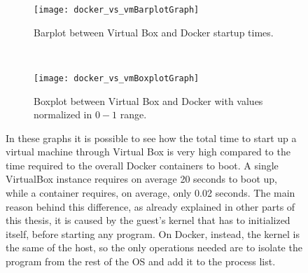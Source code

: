 \begin{figure}[t] %
    \centering
    \begin{subfigure}[b]{0.3\textwidth}
        \texttt{[image: docker\_vs\_vmBarplotGraph]}
        \caption{Barplot between Virtual Box and Docker startup times.}
        \label{chap:tests:sec:dockervsvb:img:barplot}
    \end{subfigure}
    ~ %
    \begin{subfigure}[b]{0.3\textwidth}
        \texttt{[image: docker\_vs\_vmBoxplotGraph]}
        \caption{Boxplot between Virtual Box and Docker with values normalized 
in $0-1$ range.}
        \label{chap:tests:sec:dockervsvb:img:boxplot}
    \end{subfigure}
    \caption[Virtual Box vs Docker start up comparison]{In these graphs it is 
possible to see how the total time to start up a virtual machine through Virtual 
Box is very high compared to the time required to the overall Docker containers 
to boot. A single VirtualBox instance requires on average 20 seconds to boot up, 
while a container requires, on average, only 0.02 seconds. The main reason 
behind this difference, as already explained in other parts of this thesis, it 
is caused by the guest's kernel that has to initialized itself, before starting 
any program. On Docker, instead, the kernel is the same of the host, so the only 
operations needed are to isolate the program from the rest of the OS and add it 
to the process list.}
    \label{chap:tests:sec:dockervsvb:subimg:plots}
\end{figure}

